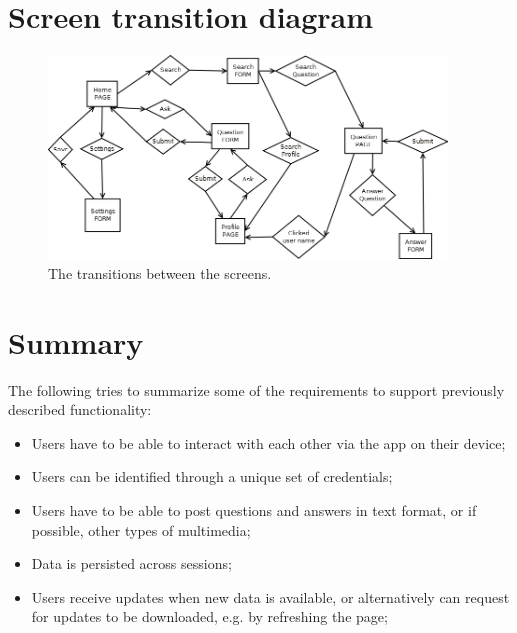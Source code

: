 \section{Screen transition diagram}\label{section:screen_transitions}


\begin{figure}
	\begin{center}
		\includegraphics[width=400px]{img/screen_transition_diagram}
	\end{center}
	\caption{The transitions between the screens.}
	\label{figure:screen_transition_diagram}
\end{figure}





\section{Summary}

The following tries to summarize some of the requirements to support previously described functionality:

\begin{itemize}
	\item Users have to be able to interact with each other via the app on their device;
	\item	Users can be identified through a unique set of credentials;
	\item Users have to be able to post questions and answers in text format, or if possible, other types of multimedia;
	\item Data is persisted across sessions;
	\item	Users receive updates when new data is available, or alternatively can request for updates to be downloaded, e.g. by refreshing the page;
\end{itemize}


